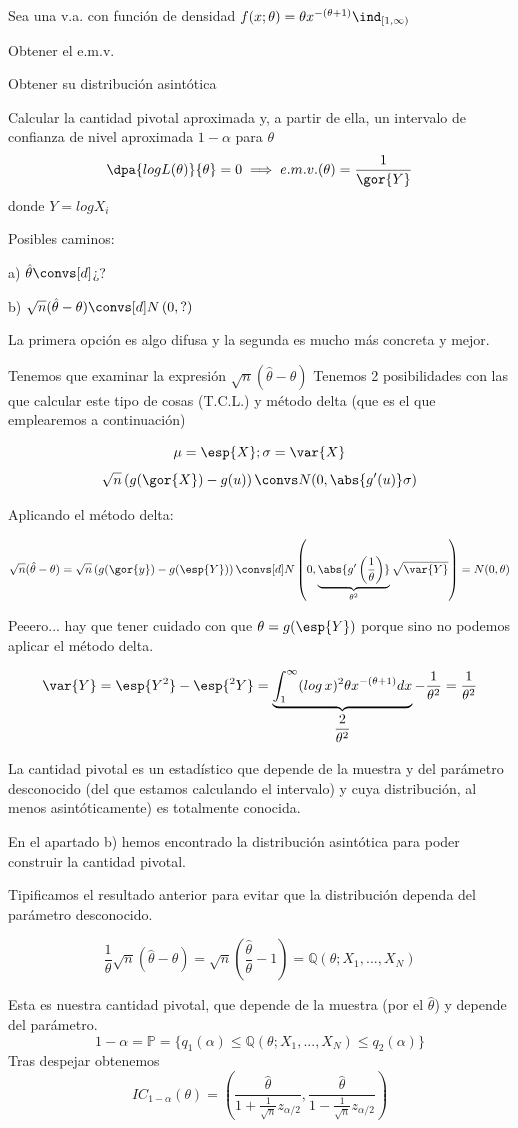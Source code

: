 \begin{problem}[5] Sea una v.a. con función de densidad $f(x;\theta) = \theta x^{-(\theta + 1)}\ind_{[1,\infty)} $

\ppart Obtener el e.m.v.

\ppart Obtener su distribución asintótica

\ppart Calcular la cantidad pivotal aproximada y, a partir de ella, un intervalo de confianza de nivel aproximada $1-\alpha$ para $\theta$
\solution
\spart \[\dpa{logL(\theta)}{\theta} = 0 \implies e.m.v.(\theta) = \frac{1}{\gor{Y}}\]
donde $Y = log X_i$

\spart Posibles caminos:

a) $ \hat{\theta} \convs[d] $¿?

b) $ \sqrt{n}(\hat{\theta} - \theta) \convs[d] N\left(0,?\right) $

\pagebreak
La primera opción es algo difusa y la segunda es mucho más concreta y mejor.

Tenemos que examinar la expresión $\sqrt{n}(\hat{\theta} - \theta)$
Tenemos 2 posibilidades con las que calcular este tipo de cosas (T.C.L.) y método delta (que es el que emplearemos a continuación)

\[ \mu = \esp{X}; \sigma = \var{X} \]
\[ \sqrt{n}\left(g(\gor{X}) - g(u)\right) \convs N(0,\abs{g'(u)} \sigma) \]

Aplicando el método delta:

\[
\sqrt{n}(\hat{\theta} - \theta) = \sqrt{ n}\left(g(\gor{y})-g(\esp{Y})\right)\convs[d] N\left(0,\underbrace{\abs{g'\left(\frac{1}{\theta}\right)}}_{\theta^2} \sqrt{\var{Y}}\right) = N(0,\theta)
\]

Peeero... hay que tener cuidado con que $\theta = g(\esp{Y})$ porque sino no podemos aplicar el método delta.

\[
\var{Y} = \esp{Y^2} - \esp{^2 Y} = \underbrace{\int_1^{\infty} (log\,x)^2 \theta x^{-(\theta + 1)}dx}_{\displaystyle\frac{2}{\theta^2}} - \frac{1}{\theta^2} = \frac{1}{\theta^2}
\]

\spart
La cantidad pivotal es un estadístico que depende de la muestra y del parámetro desconocido (del que estamos calculando el intervalo) y cuya distribución, al menos asintóticamente) es totalmente conocida.

En el apartado b) hemos encontrado la distribución asintótica para poder construir la cantidad pivotal.

Tipificamos el resultado anterior para evitar que la distribución dependa del parámetro desconocido.

\[
\frac{1}{\theta} \sqrt{n}(\hat{\theta} - \theta)  = 
\sqrt{n} \left(\frac{\hat{\theta}}{\theta} - 1 \right) = \mathbb{Q}(\theta;X_1,...,X_N)
\]

Esta es nuestra cantidad pivotal, que depende de la muestra (por el $\hat{\theta}$) y depende del parámetro.
\[1-\alpha  = \mathbb{P} = \{q_1(\alpha) \leq \mathbb{Q}(\theta;X_1,...,X_N) \leq q_2 (\alpha)\}\]
Tras despejar obtenemos
\[
IC_{1-\alpha}(\theta) =
(\frac{\hat\theta}{1 + \frac{1}{\sqrt{n}} z_{\alpha/2}}, \frac{\hat\theta}{1 - \frac{1}{\sqrt{n}} z_{\alpha/2}})
\]
\end{problem}

